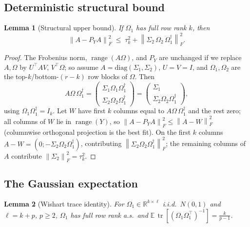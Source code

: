 \documentclass{amsart}
\newtheorem{lemma}{Lemma}
\theoremstyle{definition}
\DeclareMathOperator{\range}{range}
\DeclareMathOperator{\tr}{tr}
\newcommand{\R}{\mathbb{R}}
\newcommand{\Frob}[1]{\left\lVert #1\right\rVert_F}
\newcommand{\E}{\mathbb{E}}
\begin{document}
\subsection{Deterministic structural bound}

\begin{lemma}[Structural upper bound]\label{lem:struct}
If $\Omega_1$ has full row rank $k$, then
\begin{equation}\label{eq:structbound}
\Frob{A-P_Y A}^2 \;\le\; \tau_k^2+\Frob{\Sigma_2\,\Omega_2\,\Omega_1^{\dagger}}^2 .
\end{equation}
\end{lemma}

\begin{proof}
The Frobenius norm, $\range(A\Omega)$, and $P_Y$ are unchanged if we replace
$A,\Omega$ by $U^\top AV,\,V^\top\Omega$; so assume
$A=\mathrm{diag}(\Sigma_1,\Sigma_2)$, $U=V=I$, and $\Omega_1,\Omega_2$ are the
top-$k$/bottom-$(r-k)$ row blocks of $\Omega$. Then
\[
A\Omega\,\Omega_1^{\dagger}
=\begin{pmatrix}\Sigma_1\Omega_1\Omega_1^{\dagger}\\
\Sigma_2\Omega_2\Omega_1^{\dagger}\end{pmatrix}
=\begin{pmatrix}\Sigma_1\\ \Sigma_2\Omega_2\Omega_1^{\dagger}\end{pmatrix},
\]
using $\Omega_1\Omega_1^{\dagger}=I_k$. Let $W$ have first $k$ columns equal to
$A\Omega\,\Omega_1^{\dagger}$ and the rest zero; all columns of $W$ lie in
$\range(Y)$, so $\Frob{A-P_YA}^2\le\Frob{A-W}^2$ (columnwise orthogonal
projection is the best fit). On the first $k$ columns
$A-W=(0;-\Sigma_2\Omega_2\Omega_1^{\dagger})$, contributing
$\Frob{\Sigma_2\Omega_2\Omega_1^{\dagger}}^2$; the remaining columns of $A$
contribute $\Frob{\Sigma_2}^2=\tau_k^2$.
\end{proof}

\subsection{The Gaussian expectation}

\begin{lemma}[Wishart trace identity]\label{lem:wishart}
For $\Omega_1\in\R^{k\times\ell}$ i.i.d.\ $N(0,1)$ and $\ell=k+p$, $p\ge2$,
$\Omega_1$ has full row rank a.s.\ and
$\E\,\tr[(\Omega_1\Omega_1^\top)^{-1}]=\frac{k}{p-1}$.
\end{lemma}
\end{document}
